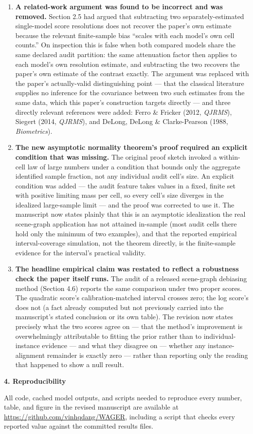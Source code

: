 \documentclass[11pt,a4paper]{article}
\begin{document}
\begin{enumerate}[leftmargin=1.5em]
\item \textbf{A related-work argument was found to be incorrect and was removed.}
Section 2.5 had argued that subtracting two separately-estimated single-model score
resolutions does not recover the paper's own estimate because the relevant finite-sample
bias ``scales with each model's own cell counts.'' On inspection this is false when both
compared models share the same declared audit partition: the same attenuation factor
then applies to each model's own resolution estimate, and subtracting the two recovers
the paper's own estimate of the contrast exactly. The argument was replaced with the
paper's actually-valid distinguishing point --- that the classical literature supplies
no inference for the covariance between two such estimates from the same data, which
this paper's construction targets directly --- and three directly relevant references
were added: Ferro \& Fricker (2012, \emph{QJRMS}), Siegert (2014, \emph{QJRMS}), and
DeLong, DeLong \& Clarke-Pearson (1988, \emph{Biometrics}).
\item \textbf{The new asymptotic normality theorem's proof required an explicit
condition that was missing.} The original proof sketch invoked a within-cell law of
large numbers under a condition that bounds only the aggregate identified sample
fraction, not any individual audit cell's size. An explicit condition was added --- the
audit feature takes values in a fixed, finite set with positive limiting mass per cell,
so every cell's size diverges in the idealized large-sample limit --- and the proof was
corrected to use it. The manuscript now states plainly that this is an asymptotic
idealization the real scene-graph application has not attained in-sample (most audit
cells there hold only the minimum of two examples), and that the reported empirical
interval-coverage simulation, not the theorem directly, is the finite-sample evidence
for the interval's practical validity.
\item \textbf{The headline empirical claim was restated to reflect a robustness check
the paper itself runs.} The audit of a released scene-graph debiasing method (Section
4.6) reports the same comparison under two proper scores. The quadratic score's
calibration-matched interval crosses zero; the log score's does not (a fact already
computed but not previously carried into the manuscript's stated conclusion or its own
table). The revision now states precisely what the two scores agree on --- that the
method's improvement is overwhelmingly attributable to fitting the prior rather than to
individual-instance evidence --- and what they disagree on --- whether any
instance-alignment remainder is exactly zero --- rather than reporting only the reading
that happened to show a null result.
\end{enumerate}

\vspace{0.5em}
\noindent\textbf{4. Reproducibility}

All code, cached model outputs, and scripts needed to reproduce every number, table, and
figure in the revised manuscript are available at
\url{https://github.com/vinhqdang/WAGER}, including a script that checks every reported
value against the committed results files.
\end{document}
